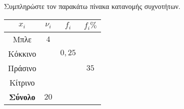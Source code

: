 Συμπληρώστε τον παρακάτω πίνακα κατανομής συχνοτήτων.\\
\begin{center}
\begin{tabular}{|c|c|c|c|}
\hline $ x_i $ & $ \nu_i $ & $ f_i $ & $ f_i\% $ \\
\hline Μπλε & $ 4 $ &  &  \\
\hline Κόκκινο &  & $ 0{,}25 $ &  \\
\hline Πράσινο &  &  & $ 35 $ \\
\hline Κίτρινο &  &  &  \\
\hline \textbf{Σύνολο} & $ 20 $ &  & \\
\hline
\end{tabular}
\end{center}
